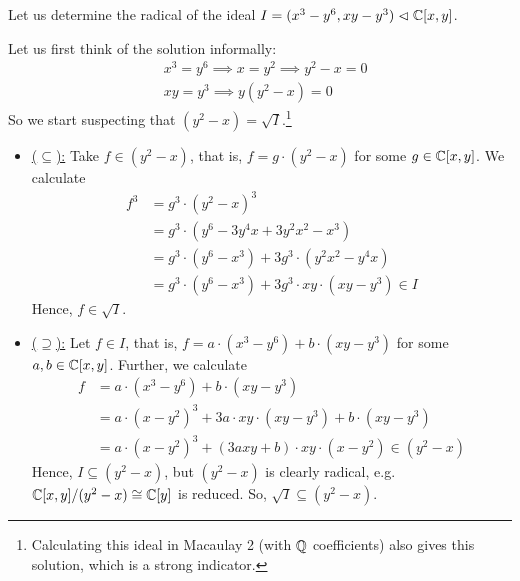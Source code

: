 \documentclass[a4paper, 12pt]{article}
\begin{document}
\begin{Exercise}
    Let us determine the radical of the ideal $I = (x^3 - y^6, xy - y^3) \vartriangleleft \mathbb{C}[x, y]$.

    Let us first think of the solution informally:
    \begin{align*}
        &x^3 = y^6 \implies x = y^2 \implies y^2 - x = 0 \\
        &xy = y^3 \implies y(y^2 - x) = 0
    \end{align*}
    So we start suspecting that $(y^2 -x ) = \sqrt{I}$.\footnote{Calculating this ideal in Macaulay 2 (with $\mathbb{Q}$ coefficients) also gives this solution, which is a strong indicator.}
    \begin{itemize}
        \item \underline{($\subseteq$):}
            Take $f \in (y^2 - x)$, that is, $f = g \cdot (y^2 - x)$ for some $g \in \mathbb{C}[x, y]$.
            We calculate
            \begin{align*}
                f^3
                &= g^3\cdot (y^2 - x)^3 \\
                &= g^3 \cdot (y^6 - 3y^4x + 3y^2x^2 - x^3) \\
                &= g^3 \cdot (y^6 - x^3) + 3g^3 \cdot (y^2x^2 - y^4x) \\
                &= g^3 \cdot (y^6 - x^3) + 3g^3 \cdot xy \cdot (xy - y^3) \in I
            \end{align*}
            Hence, $f \in \sqrt{I}$.
        \item \underline{($\supseteq$):}
            Let $f \in I$, that is, $f = a \cdot (x^3 - y^6) + b \cdot (xy - y^3)$ for some $a, b \in \mathbb{C}[x, y]$.
            Further, we calculate
            \begin{align*}
                f &= a \cdot (x^3 - y^6) + b \cdot (xy - y^3) \\
                &= a \cdot (x - y^2)^3 + 3a \cdot xy \cdot (xy - y^3) + b \cdot (xy - y^3) \\
                &= a \cdot (x - y^2)^3 + (3axy + b)\cdot xy \cdot (x - y^2) \in (y^2 - x)
            \end{align*}
            Hence, $I \subseteq (y^2 - x)$, but $(y^2 - x)$ is clearly radical, e.g. $\mathbb{C}[x, y]/(y^2-x) \cong \mathbb{C}[y]$ is reduced.
            So, $\sqrt{I} \subseteq (y^2 - x)$.
    \end{itemize}
\end{Exercise}
\end{document}
